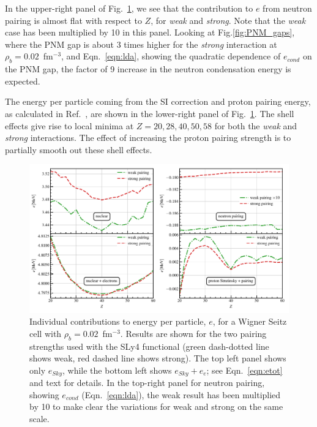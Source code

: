 \documentclass[
    amsmath,amssymb,
    aps,
    prc,
    floatfix,
]{revtex4-2}
\begin{document}
In the upper-right panel of Fig.~\ref{fig:e_contributions}, we see that the contribution to $e$ from neutron pairing is almost flat with respect to $Z$, for \emph{weak} and \emph{strong}. Note that the \emph{weak} case has been multiplied by 10 in this panel. Looking at Fig.\ref{fig:PNM_gaps}, where the PNM gap is about 3 times higher for the \emph{strong} interaction at $\rho_b=0.02$~fm$^{-3}$, and Eqn.~\ref{eqn:lda}, showing the quadratic dependence of $e_{cond}$ on the PNM gap, the factor of 9 increase in the neutron condensation energy is expected.

The energy per particle coming from the SI correction and proton pairing energy, as calculated in Ref.~\cite{pearson2015role}, are shown in the lower-right panel of Fig.~\ref{fig:e_contributions}. The shell effects give rise to local minima at $Z=20,28,40,50,58$ for both the \emph{weak} and \emph{strong} interactions. The effect of increasing the proton pairing strength is to partially smooth out these shell effects.

    \begin{figure}
        \centering
        \includegraphics{figs/e_contributions.pdf}
        \caption{Individual contributions to energy per particle, $e$, for a Wigner Seitz cell with $\rho_b=0.02$~fm$^{-3}$. Results are shown for the two pairing strengths used with the SLy4 functional (green dash-dotted line shows weak, red dashed line shows strong). The top left panel shows only $e_{Sky}$, while the bottom left shows $e_{Sky}+e_e$; see Eqn.~\ref{eqn:etot} and text for details. In the top-right panel for neutron pairing, showing $e_{cond}$ (Eqn.~\ref{eqn:lda}), the weak result has been multiplied by 10 to make clear the variations for weak and strong on the same scale.}
        \label{fig:e_contributions}
    \end{figure}
\end{document}
